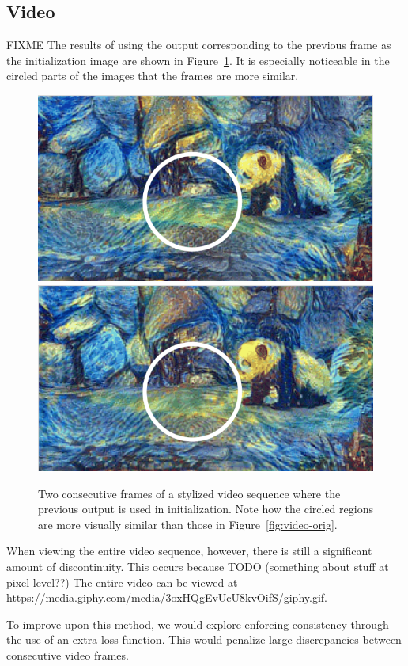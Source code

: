 \documentclass[10pt,twocolumn,letterpaper]{article}
\begin{document}
\subsection{Video}
FIXME
The results of using the output corresponding to the previous frame as the initialization image are shown in Figure~\ref{fig:video-final}. It is especially noticeable in the circled parts of the images that the frames are more similar. 

\begin{figure}[ht]
\centering
\includegraphics[width=0.49\linewidth]{imgs/pandap1.png}
\includegraphics[width=0.49\linewidth]{imgs/pandap2.png}
\caption{Two consecutive frames of a stylized video sequence where the previous output is used in initialization. Note how the circled regions are more visually similar than those in Figure~\ref{fig:video-orig}.}
\label{fig:video-final}
\end{figure}

When viewing the entire video sequence, however, there is still a significant amount of discontinuity. This occurs because TODO (something about stuff at pixel level??) The entire video can be viewed at \url{https://media.giphy.com/media/3oxHQgEvUcU8kvOifS/giphy.gif}. 

To improve upon this method, we would explore enforcing consistency through the use of an extra loss function. This would penalize large discrepancies between consecutive video frames.
\end{document}
